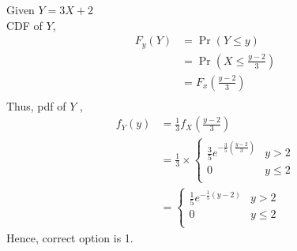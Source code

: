 Given $Y=3X+2$ \\
    CDF of $Y$, 
    \begin{align*}
        F_y(Y) &= \Pr(Y\leq y) \\
        &= \Pr\left(X \leq \frac{y-2}{3} \right) \\
        &= F_x\left(\frac{y-2}{3}\right) \\
    \end{align*}
    Thus, pdf of $Y$ ,\begin{align*}
        f_Y(y) &= \frac{1}{3}f_X\left(\frac{y-2}{3}\right)\\
        &= \frac{1}{3} \times \begin{cases} \frac{3}{5}e^{-\frac{3}{5}\left(\frac{y-2}{3}\right)}  & y>2 \\
        0 & y \leq 2 \\\end{cases}\\
        &= \begin{cases} 
      \frac{1}{5}e^{-\frac{1}{5} (y-2)} & y > 2 \\
      0 & y \leq 2\\
   \end{cases} 
    \end{align*}
Hence, correct option is 1. 